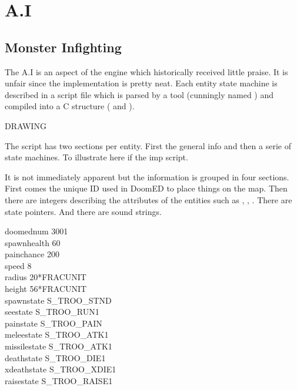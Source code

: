 \section{A.I}

\subsection{Monster Infighting}

The A.I is an aspect of the engine which historically received little praise. It is unfair since the implementation is pretty neat. Each entity state machine is described in a script file  which is parsed by a tool (cunningly named ) and compiled into a C structure ( and ).\\
\par
DRAWING
\par
The script has two sections per entity. First the general info and then a serie of state machines. To illustrate here if the imp script.\\
\par
{}
\par
It is not immediately apparent but the information is grouped in four sections. First comes the unique ID used in DoomED to place things on the map. Then there are integers describing the attributes of the entities such as , , . There are state pointers. And there are sound strings.\\
\par
doomednum        3001\\

spawnhealth        60\\
painchance        200\\
speed            8\\
radius            20*FRACUNIT\\
height            56*FRACUNIT\\

spawnstate        S\_TROO\_STND\\
seestate        S\_TROO\_RUN1\\
painstate        S\_TROO\_PAIN\\
meleestate        S\_TROO\_ATK1\\
missilestate    S\_TROO\_ATK1\\
deathstate        S\_TROO\_DIE1\\
xdeathstate        S\_TROO\_XDIE1\\
raisestate        S\_TROO\_RAISE1\\

